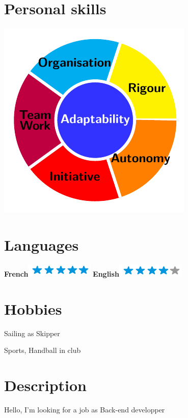 \documentclass{friggeri-cv}
\begin{document}
\begin{aside}
	\section{Personal skills}
	\includegraphics[scale=0.75]{test.pdf}
	~
	\section{Languages}
	\textbf{French}\includegraphics[scale=0.40]{img/5stars.png}
	\textbf{English}\includegraphics[scale=0.40]{img/4stars.png}
	~
	\section{Hobbies}
\item Sailing as Skipper
\item Sports, Handball in club
\end{aside}

\section{Description}
\begin{entrylist}
	Hello, I'm looking for a job as Back-end developper
\end{entrylist}
\end{document}
